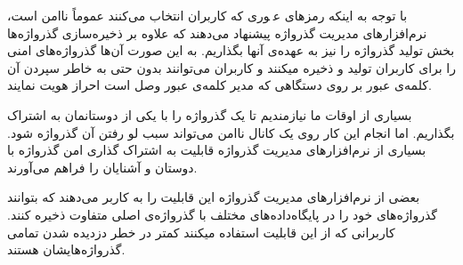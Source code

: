 با توجه به اینکه رمزهای عبٖوری که کاربران انتخاب می‌کنند عموماً ناامن است، نرم‌افزارهای مدیریت گذرواژه پیشنهاد می‌دهند که علاوه بر ذخیره‌سازی گذرواژه‌ها بخش تولید گذرواژه را نیز به عهده‌ی آنها بگذاریم. به این صورت آن‌ها گذرواژه‌های امنی را برای کاربران تولید و ذخیره میکنند و کاربران می‌توانند بدون حتی به خاطر سپردن آن کلمه‌ی عبور بر روی دستگاهی که مدیر کلمه‌ی عبور وصل است احراز هویت نمایند.


بسیاری از اوقات ما نیازمندیم تا یک گذرواژه را با یکی از دوستانمان به اشتراک بگذاریم. اما انجام این کار روی یک کانال ناامن می‌تواند سبب لو رفتن آن گذرواژه شود. بسیاری از نرم‌افزارهای مدیریت گذرواژه قابلیت به اشتراک گذاری امن گذرواژه با دوستان و آشنایان را فراهم می‌آورند.


بعضی از نرم‌افزارهای مدیریت گذرواژه این قابلیت را به کاربر می‌دهند که بتوانند گذرواژه‌های خود را در پایگاه‌داده‌های مختلف با گذرواژه‌ی اصلی متفاوت ذخیره کنند. کاربرانی که از این قابلیت استفاده میکنند کمتر در خطر دزدیده شدن تمامی گذرواژه‌هایشان هستند.
